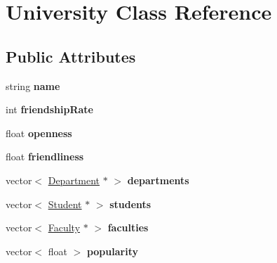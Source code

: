 \hypertarget{classUniversity}{\section{\-University \-Class \-Reference}
\label{classUniversity}
}
\subsection*{\-Public \-Attributes}
\begin{DoxyCompactItemize}
\item 
\hypertarget{classUniversity_a2a8af7dfd2ed7333922f6e2e94cd19a5}{string {\bfseries name}}\label{classUniversity_a2a8af7dfd2ed7333922f6e2e94cd19a5}

\item 
\hypertarget{classUniversity_a3dfc32b2290a844a64214cb84e126c71}{int {\bfseries friendship\-Rate}}\label{classUniversity_a3dfc32b2290a844a64214cb84e126c71}

\item 
\hypertarget{classUniversity_accc4ecb2a9e5f3b4fe0defa51e7aaa7b}{float {\bfseries openness}}\label{classUniversity_accc4ecb2a9e5f3b4fe0defa51e7aaa7b}

\item 
\hypertarget{classUniversity_a181ad9e668561d90f10b66bf854d4ba2}{float {\bfseries friendliness}}\label{classUniversity_a181ad9e668561d90f10b66bf854d4ba2}

\item 
\hypertarget{classUniversity_a551afd53f5510095c6dbbaa40a5e6d8e}{vector$<$ \hyperlink{classDepartment}{\-Department} $\ast$ $>$ {\bfseries departments}}\label{classUniversity_a551afd53f5510095c6dbbaa40a5e6d8e}

\item 
\hypertarget{classUniversity_a40849f11020c803a8b76241a2931cdcc}{vector$<$ \hyperlink{classStudent}{\-Student} $\ast$ $>$ {\bfseries students}}\label{classUniversity_a40849f11020c803a8b76241a2931cdcc}

\item 
\hypertarget{classUniversity_ad408ee56d8722297ab3a783099eb8bdc}{vector$<$ \hyperlink{classFaculty}{\-Faculty} $\ast$ $>$ {\bfseries faculties}}\label{classUniversity_ad408ee56d8722297ab3a783099eb8bdc}

\item 
\hypertarget{classUniversity_a1a46aba02d3bcf058789dca6164faba1}{vector$<$ float $>$ {\bfseries popularity}}\label{classUniversity_a1a46aba02d3bcf058789dca6164faba1}


\end{DoxyCompactItemize}
